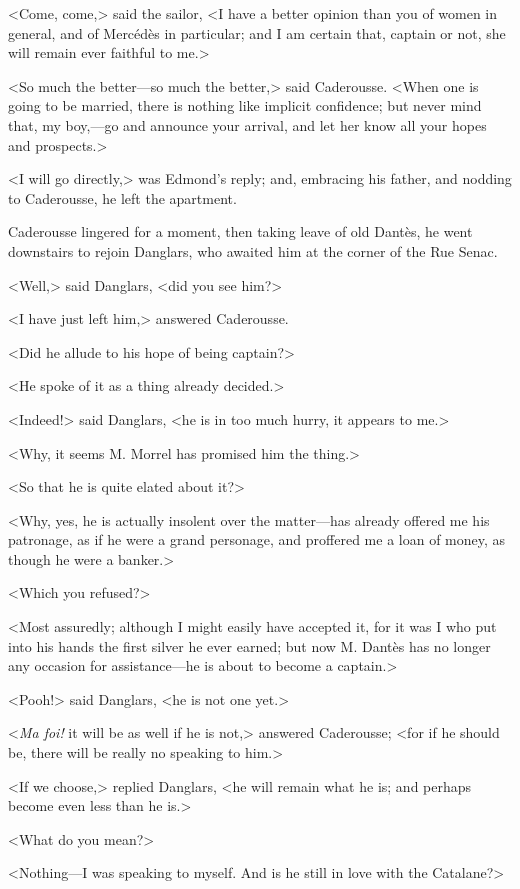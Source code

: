  <Come, come,> said the sailor, <I have a better opinion than you of women in general, and of Mercédès in particular; and I am certain that, captain or not, she will remain ever faithful to me.> 

 <So much the better—so much the better,> said Caderousse. <When one is going to be married, there is nothing like implicit confidence; but never mind that, my boy,—go and announce your arrival, and let her know all your hopes and prospects.> 

 <I will go directly,> was Edmond's reply; and, embracing his father, and nodding to Caderousse, he left the apartment. 

 Caderousse lingered for a moment, then taking leave of old Dantès, he went downstairs to rejoin Danglars, who awaited him at the corner of the Rue Senac. 

 <Well,> said Danglars, <did you see him?> 

 <I have just left him,> answered Caderousse. 

 <Did he allude to his hope of being captain?> 

 <He spoke of it as a thing already decided.> 

 <Indeed!> said Danglars, <he is in too much hurry, it appears to me.> 

 <Why, it seems M. Morrel has promised him the thing.> 

 <So that he is quite elated about it?> 

 <Why, yes, he is actually insolent over the matter—has already offered me his patronage, as if he were a grand personage, and proffered me a loan of money, as though he were a banker.> 

 <Which you refused?> 

 <Most assuredly; although I might easily have accepted it, for it was I who put into his hands the first silver he ever earned; but now M. Dantès has no longer any occasion for assistance—he is about to become a captain.> 

 <Pooh!> said Danglars, <he is not one yet.> 

 <\textit{Ma foi!} it will be as well if he is not,> answered Caderousse; <for if he should be, there will be really no speaking to him.> 

 <If we choose,> replied Danglars, <he will remain what he is; and perhaps become even less than he is.> 

 <What do you mean?> 

 <Nothing—I was speaking to myself. And is he still in love with the Catalane?> 

